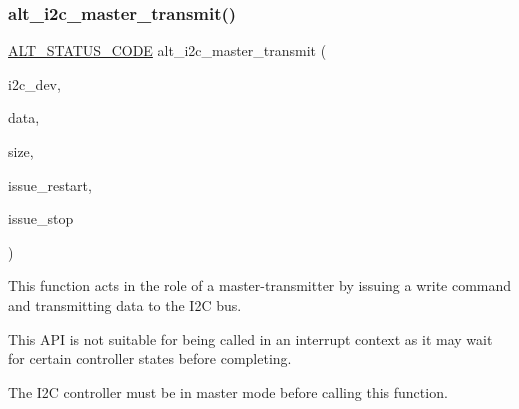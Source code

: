 \subsubsection{\texorpdfstring{alt\_i2c\_master\_transmit()}{alt\_i2c\_master\_transmit()}}
{\footnotesize\ttfamily \mbox{\hyperlink{hwlib_8h_abdb0d369f069723ca55d6c94bcaaaa12}{A\+L\+T\+\_\+\+S\+T\+A\+T\+U\+S\+\_\+\+C\+O\+DE}} alt\+\_\+i2c\+\_\+master\+\_\+transmit (\begin{DoxyParamCaption}\item[{\mbox{\hyperlink{structALT__I2C__DEV__s}{A\+L\+T\+\_\+\+I2\+C\+\_\+\+D\+E\+V\+\_\+t}} $\ast$}]{i2c\+\_\+dev,  }\item[{const void $\ast$}]{data,  }\item[{const size\+\_\+t}]{size,  }\item[{const bool}]{issue\+\_\+restart,  }\item[{const bool}]{issue\+\_\+stop }\end{DoxyParamCaption})}

This function acts in the role of a master-\/transmitter by issuing a write command and transmitting data to the I2C bus.

This A\+PI is not suitable for being called in an interrupt context as it may wait for certain controller states before completing.

The I2C controller must be in master mode before calling this function.


